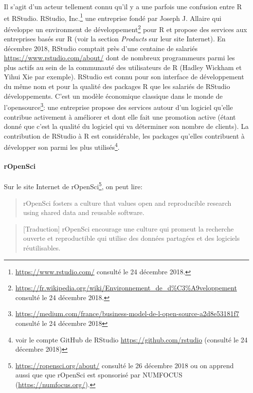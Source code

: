 \documentclass[]{article}
\let\oldparagraph\paragraph
\renewcommand{\paragraph}[1]{\oldparagraph{#1}\mbox{}}
\begin{document}
Il s'agit d'un acteur tellement connu qu'il y a une parfois une confusion
entre R et RStudio. RStudio, Inc.\footnote{\url{https://www.rstudio.com/} consulté le 24 décembre 2018.} une entreprise fondé par Joseph J. Allaire qui développe un environment de développement\footnote{\url{https://fr.wikipedia.org/wiki/Environnement_de_d\%C3\%A9veloppement} consulté le 24 décembre 2018.} pour R et propose des services aux entreprises basés sur R (voir la section \emph{Products} sur leur site Internet). En décembre 2018, RStudio comptait près d'une centaine de salariés \url{https://www.rstudio.com/about/} dont de nombreux programmeurs parmi les plus actifs au sein de la communauté des utilisateurs de R (Hadley Wickham et Yihui Xie par exemple). RStudio est connu pour son interface de développement du même nom et pour la qualité des packages R que les salariés de RStudio développements. C'est un modèle économique classique dans le monde de l'opensource\footnote{\url{https://medium.com/france/business-model-de-l-open-source-a2d8e53181f7} consulté le 24 décembre 2018}: une entreprise propose des services autour d'un logiciel qu'elle contribue activement à améliorer et dont elle fait une promotion active (étant donné que c'est la qualité du logiciel qui va déterminer son nombre de clients). La contribution de RStudio à R est considérable, les packages qu'elles contribuent à développer son parmi les plus utilisés\footnote{voir le compte GitHub de RStudio \url{https://github.com/rstudio} (consulté le 24 décembre 2018)}.

\hypertarget{ropensci}{%
\paragraph{rOpenSci}\label{ropensci}}

Sur le site Internet de rOpenSci\footnote{\url{https://ropensci.org/about/} consulté le 26 décembre 2018 ou on apprend aussi que que rOpenSci est sponsorisé par NUMFOCUS (\url{https://numfocus.org/}).}, on peut lire:

\begin{quote}
rOpenSci fosters a culture that values open and reproducible research using shared data and reusable software.
\end{quote}

\begin{quote}
{[}Traduction{]} rOpenSci encourage une culture qui promeut la recherche ouverte et reproductible qui utilise des données partagées et des logiciels réutilisables.
\end{quote}
\end{document}
